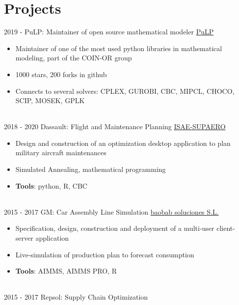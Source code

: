 \documentclass[letterpaper]{twentysecondcv} %
\begin{document}
\section{Projects}
\begin{twenty}
	\twentyitem
    	{2019 - }
		{}
        {PuLP: Maintainer of open source mathematical modeler}
        {\href{https://github.com/coin-or/pulp}{PuLP}}
        {}
        {
        {\begin{itemize}
        \item Maintainer of one of the most used python libraries in mathematical modeling, part of the COIN-OR group
        \item 1000 stars, 200 forks in github
        \item Connects to several solvers: CPLEX, GUROBI, CBC, MIPCL, CHOCO, SCIP, MOSEK, GPLK
        \vspace{2mm}
		\end{itemize}}
        }
  \\
  \twentyitem
      {2018 - 2020}
    {}
        {Dassault: Flight and Maintenance Planning}
        {\href{https://www.isae-supaero.fr/en/}{ISAE-SUPAERO}}
        {}
        {
        {\begin{itemize}
        \item Design and construction of an optimization desktop application to plan military aircraft maintenances
        \item Simulated Annealing, mathematical programming
        \item \textbf{Tools}: python, R, CBC
        \vspace{2mm}
    \end{itemize}}
        }
  \\
  \twentyitem
      {2015 - 2017}
    {}
        {GM: Car Assembly Line Simulation}
        {\href{https://baobabsoluciones.es/en/}{baobab soluciones S.L.}}
        {}
        {
        {\begin{itemize}
        \item Specification, design, construction and deployment of a multi-user client-server application
        \item Live-simulation of production plan to forecast consumption
        \item \textbf{Tools}: AIMMS, AIMMS PRO, R
        \vspace{2mm}
    \end{itemize}}
        }
  \\
  \twentyitem
      {2015 - 2017 }
    {}
        {Repsol: Supply Chain Optimization}

\end{twenty}
\end{document}
